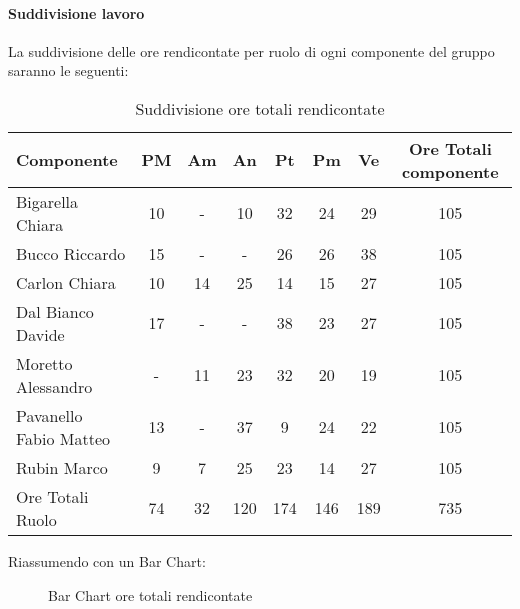 			\paragraph{Suddivisione lavoro}
				La suddivisione delle ore rendicontate per ruolo di ogni componente del gruppo \groupname{} saranno le seguenti:
				\begin{table}
					\begin{center}
						\begin{tabular}{| l | c | c | c | c | c | c | c |}
							\hline
							Componente 					& PM		& Am 		& An 		& Pt 		& Pm 		& Ve 		& Ore Totali componente \\ \hline
							
							Bigarella Chiara 			& 10 		& - 		& 10 		& 32 		& 24 		& 29 		& 105 \\
							Bucco Riccardo 				& 15 		& - 		& - 		& 26 		& 26		& 38 		& 105 \\
							Carlon Chiara	 			& 10 		& 14 		& 25 		& 14 		& 15 		& 27 		& 105 \\
							Dal Bianco Davide 			& 17 		& - 		& - 		& 38 		& 23 		& 27 		& 105 \\
							Moretto Alessandro 			& - 		& 11 		& 23 		& 32 		& 20 		& 19 		& 105 \\
							Pavanello Fabio Matteo	 	& 13 		& - 		& 37 		& 9 		& 24 		& 22 		& 105 \\
							Rubin Marco					& 9 		& 7 		& 25 		& 23 		& 14 		& 27 		& 105 \\ \hline \hline
							
							Ore Totali Ruolo 			& 74 		& 32 		& 120 		& 174 		& 146 		& 189 		& 735\\ \hline
						\end{tabular}
					\end{center}
					\caption{Suddivisione ore totali rendicontate}
				\end{table}
				Riassumendo con un Bar Chart:
				\begin{figure}\centering
					\caption{Bar Chart ore totali rendicontate}
				\end{figure}
